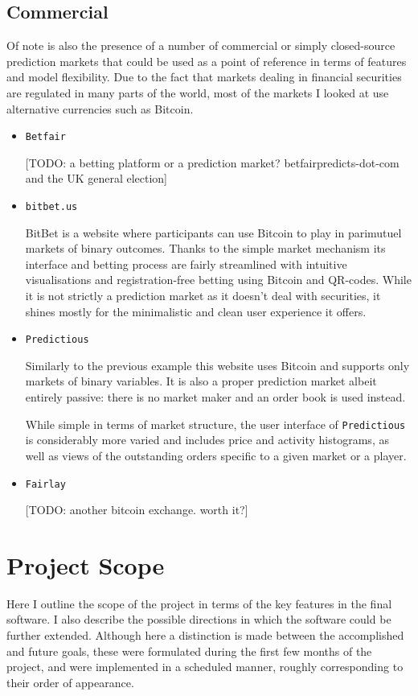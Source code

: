 \documentclass[bsc,frontabs,twoside,singlespacing,parskip,deptreport]{infthesis}     %
\begin{document}
\section{Commercial}
    Of note is also the presence of a number of commercial or simply closed-source prediction markets that could be used as a point of reference in terms of features and model flexibility. Due to the fact that markets dealing in financial securities are regulated in many parts of the world, most of the markets I looked at use alternative currencies such as Bitcoin. 
    
\begin{itemize}

\item {\tt Betfair}

    [TODO: a betting platform or a prediction market? betfairpredicts-dot-com and the UK general election]
    
\item {\tt bitbet.us}

    BitBet is a website where participants can use Bitcoin to play in parimutuel markets of binary outcomes. Thanks to the simple market mechanism its interface and betting process are fairly streamlined with intuitive visualisations and registration-free betting using Bitcoin and QR-codes. While it is not strictly a prediction market as it doesn't deal with securities, it shines mostly for the minimalistic and clean user experience it offers.

\item {\tt Predictious}

    Similarly to the previous example this website uses Bitcoin and supports only markets of binary variables. It is also a proper prediction market albeit entirely passive: there is no market maker and an order book is used instead.

    While simple in terms of market structure, the user interface of {\tt Predictious} is considerably more varied and includes price and activity histograms, as well as views of the outstanding orders specific to a given market or a player.


\item {\tt Fairlay} 

    [TODO: another bitcoin exchange. worth it?]

\end{itemize}


\chapter{Project Scope}
    Here I outline the scope of the project in terms of the key features in the final software. I also describe the possible directions in which the software could be further extended. Although here a distinction is made between the accomplished and future goals, these were formulated during the first few months of the project, and were implemented in a scheduled manner, roughly corresponding to their order of appearance. 
\end{document}
